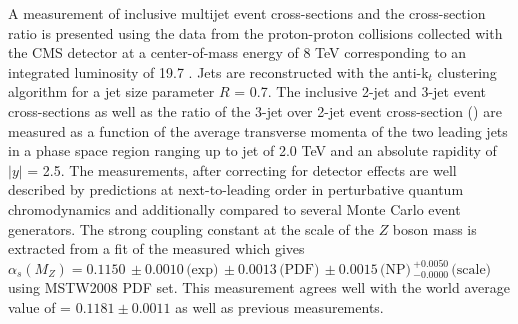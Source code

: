A measurement of inclusive multijet event cross-sections and the cross-section ratio is presented using the data from the proton-proton collisions collected with the CMS detector at a center-of-mass energy of 8 TeV corresponding to an integrated luminosity of 19.7 \fbinv. Jets are reconstructed with the anti-k$_t$ clustering algorithm for a jet size parameter $R$ = 0.7. The inclusive 2-jet and 3-jet event cross-sections as well as the ratio of the 3-jet over 2-jet event cross-section (\ratio) are measured as a function of the average transverse momenta \pt of the two leading jets in a phase space region ranging up to jet \pt of 2.0 TeV and an absolute rapidity of $|y|$ = 2.5. The measurements, after correcting for detector effects are well described by predictions at next-to-leading order in perturbative quantum chromodynamics and additionally compared to several Monte Carlo event generators. The strong coupling constant at the scale of the $Z$ boson mass is extracted from a fit of the measured \ratio which gives $\alpha_s(M_Z) = 0.1150\,\pm0.0010\,\textrm{(exp)}\,\pm0.0013\,\textrm{(PDF)}\, \pm0.0015\,\textrm{(NP)}\,^{+0.0050}_{-0.0000}\,\textrm{(scale)}$ using MSTW2008 PDF set. This measurement agrees well with the world average value of \alpsmz = $0.1181 \pm 0.0011$ as well as previous measurements.

